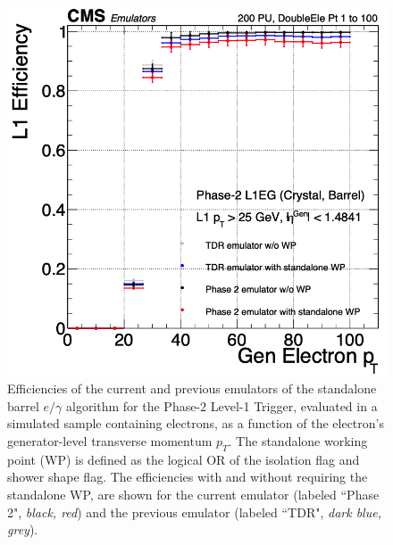 \begin{figure}[ht]
    \centering
    \includegraphics[width=12cm]{figures/ch-3-phase2/results-egamma-efficiency-gt25.png}
    \caption{Efficiencies of the current and previous emulators of the standalone barrel $e/\gamma$ algorithm for the Phase-2 Level-1 Trigger, evaluated in a simulated sample containing electrons, as a function of the electron's generator-level transverse momentum $p_{T}$. The standalone working point (WP) is defined as the logical OR of the isolation flag and shower shape flag. The efficiencies with and without requiring the standalone WP, are shown for the current emulator (labeled ``Phase 2", \textit{black, red}) and the previous emulator (labeled ``TDR", \textit{dark blue, grey}).}
    \label{fig:results-egamma-efficiency-gt25}
\end{figure}

